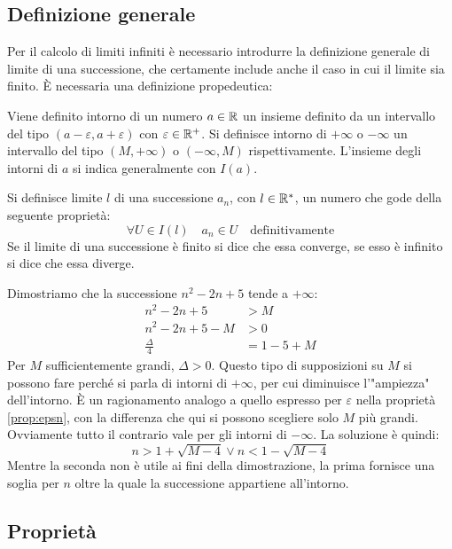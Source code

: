 \subsection{Definizione generale}
Per il calcolo di limiti infiniti è necessario introdurre la definizione generale di limite di una successione, che certamente include anche il caso in cui il limite sia finito. È necessaria una definizione propedeutica:
\begin{defin}
	Viene definito intorno di un numero $a\in\mathbb{R}$ un insieme definito da un intervallo del tipo $(a-\varepsilon,a+\varepsilon)$ con $\varepsilon\in\mathbb{R}^+$. Si definisce intorno di $+\infty$ o $-\infty$ un intervallo del tipo $(M,+\infty)$ o $(-\infty,M)$ rispettivamente. L'insieme degli intorni di $a$ si indica generalmente con $I(a)$.
\end{defin}
\begin{defin}
	Si definisce limite $l$ di una successione $a_n$, con $l\in\mathbb{R}^*$, un numero che gode della seguente proprietà:
	\[
		\forall U\in I(l)\quad a_n\in U\quad\text{definitivamente}
	\]
	Se il limite di una successione è finito si dice che essa converge, se esso è infinito si dice che essa diverge.
\end{defin}
\begin{examp}
	Dimostriamo che la successione $n^2-2n+5$ tende a $+\infty$:
	\begin{align*}
		n^2-2n+5         & >M     \\
		n^2-2n+5-M       & >0     \\
		\frac{\Delta}{4} & =1-5+M
	\end{align*}
	Per $M$ sufficientemente grandi, $\Delta>0$. Questo tipo di supposizioni su $M$ si possono fare perché si parla di intorni di $+\infty$, per cui diminuisce l'"ampiezza" dell'intorno. È un ragionamento analogo a quello espresso per $\varepsilon$ nella proprietà \ref{prop:epsn}, con la differenza che qui si possono scegliere solo $M$ più grandi. Ovviamente tutto il contrario vale per gli intorni di $-\infty$. La soluzione è quindi:
	\[
		n>1+\sqrt{M-4}\lor n<1-\sqrt{M-4}
	\]
	Mentre la seconda non è utile ai fini della dimostrazione, la prima fornisce una soglia per $n$ oltre la quale la successione appartiene all'intorno.
\end{examp}


\subsection{Proprietà}

